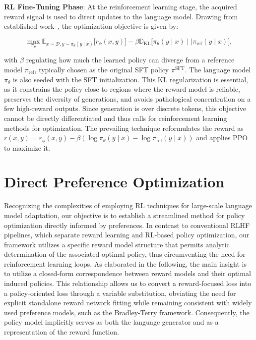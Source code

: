 \textbf{RL Fine-Tuning Phase}: At the reinforcement learning stage, the acquired reward signal is used to direct updates to the language model. Drawing from established work~\citep{jaques2017sequence, jaques2020human}, the optimization objective is given by:

\begin{equation}\label{eq:RL}
\max_{\pi_{\theta}}  \mathbb{E}_{x\sim \mathcal{D}, y\sim \pi_{\theta}(y \mid x)}\bigl[r_{\phi}(x, y)\bigr] - \beta\mathbb{D}_{\textrm{KL}}\bigl[\pi_{\theta}(y\mid x)\mid \mid \pi_\text{ref}(y\mid x)\bigr],
\end{equation}

with $\beta$ regulating how much the learned policy can diverge from a reference model $\pi_\text{ref}$, typically chosen as the original SFT policy $\pi^\text{SFT}$. The language model $\pi_\theta$ is also seeded with the SFT initialization. This KL regularization is essential, as it constrains the policy close to regions where the reward model is reliable, preserves the diversity of generations, and avoids pathological concentration on a few high-reward outputs. Since generation is over discrete tokens, this objective cannot be directly differentiated and thus calls for reinforcement learning methods for optimization. The prevailing technique \citep{ziegler2020finetuning, stiennon2022learning, bai2022training, ouyang2022training} reformulates the reward as ${r(x, y) = r_{\phi}(x, y) -\beta (\log \pi_{\theta}(y\mid x) - \log \pi_\text{ref}(y\mid x))}$ and applies PPO \cite{schulman2017proximal} to maximize it.

\section{Direct Preference Optimization}\label{sec:DPO}

Recognizing the complexities of employing RL techniques for large-scale language model adaptation, our objective is to establish a streamlined method for policy optimization directly informed by preferences. In contrast to conventional RLHF pipelines, which separate reward learning and RL-based policy optimization, our framework utilizes a specific reward model structure that permits analytic determination of the associated optimal policy, thus circumventing the need for reinforcement learning loops. As elaborated in the following, the main insight is to utilize a closed-form correspondence between reward models and their optimal induced policies. This relationship allows us to convert a reward-focused loss into a policy-oriented loss through a variable substitution, obviating the need for explicit standalone reward network fitting while remaining consistent with widely used preference models, such as the Bradley-Terry framework. Consequently, the policy model implicitly serves as both the language generator and as a representation of the reward function.

